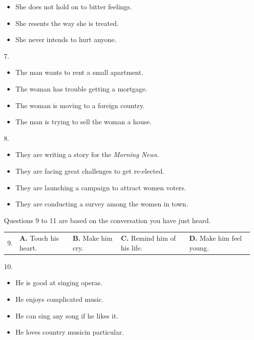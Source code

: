 \documentclass[UTF8,11pt]{ctexart}
\begin{document}
\begin{itemize}[leftmargin=2em,itemsep=.2em,topsep=.4em]\item[B.] She does not hold on to bitter feelings.
\item[C.] She resents the way she is treated.
\item[D.] She never intends to hurt anyone.
\end{itemize}

7.


\begin{itemize}[leftmargin=2em,itemsep=.2em,topsep=.4em]\item[A.] The man wants to rent a small apartment.
\item[B.] The woman has trouble getting a mortgage.
\item[C.] The woman is moving to a foreign country.
\item[D.] The man is trying to sell the woman a house.
\end{itemize}

8.


\begin{itemize}[leftmargin=2em,itemsep=.2em,topsep=.4em]\item[A.] They are writing a story for the\textit{ Morning News.}
\item[B.] They are facing great challenges to get re-elected.
\item[C.] They are launching a campaign to attract women voters.
\end{itemize}

\begin{itemize}[leftmargin=2em,itemsep=.2em,topsep=.4em]\item[D.] They are conducting a survey among the women in town.
\end{itemize}

Questions 9 to 11 are based on the conversation you have just heard.


\noindent\begin{tabularx}{\linewidth}{@{}lXXXX@{}}9. & \textbf{A.} Touch his heart. & \textbf{B.} Make him cry. & \textbf{C.} Remind him of his life. & \textbf{D.} Make him feel young.\\\end{tabularx}\par

10.


\begin{itemize}[leftmargin=2em,itemsep=.2em,topsep=.4em]\item[A.] He is good at singing operas.
\item[B.] He enjoys complicated music.
\item[C.] He can sing any song if he likes it.
\item[D.] He loves country musicin particular.
\end{itemize}
\end{document}
